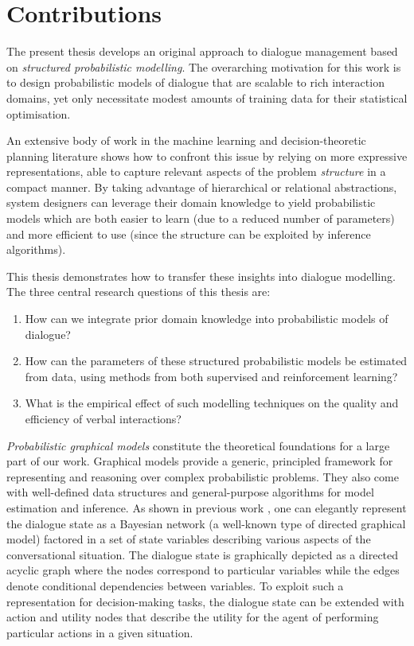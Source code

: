 \section{Contributions}

The present thesis develops an original approach to dialogue management based on \textit{structured probabilistic modelling}.  The overarching motivation for this work is to design probabilistic models of dialogue that are scalable to rich interaction domains, yet only necessitate modest amounts of training data for their statistical optimisation.

An extensive body of work in the machine learning and decision-theoretic planning literature shows how to confront this issue by relying on more expressive representations, able to capture relevant aspects of the problem \textit{structure} in a compact manner. By taking advantage of hierarchical or relational abstractions, system designers can leverage their domain knowledge to yield probabilistic models which are both easier to learn (due to a reduced number of parameters) and more efficient to use (since the structure can be exploited by inference algorithms).  

This thesis demonstrates how to transfer these insights into dialogue modelling.  The three central research questions of this thesis are:
\begin{enumerate}
\item How can we integrate prior domain knowledge into probabilistic models of dialogue?
\item How can the parameters of these structured probabilistic models be estimated from data, using methods from both supervised and reinforcement learning?  
\item What is the empirical effect of such modelling techniques on the quality and efficiency of verbal interactions?
\end{enumerate}

\textit{Probabilistic graphical models} \citep{Koller+Friedman:09} constitute the theoretical foundations for a large part of our work.  Graphical models provide a generic, principled framework for representing and reasoning over complex probabilistic problems. They also come with well-defined data structures and general-purpose algorithms for model estimation and inference.  As shown in previous work \citep[see for instance][]{Thomson:2010:BUD:1772996.1773040}, one can elegantly represent the dialogue state as a Bayesian network (a well-known type of directed graphical model) factored in a set of state variables describing various aspects of the conversational situation.  The dialogue state is graphically depicted as a directed acyclic graph where the nodes correspond to particular variables while the edges denote conditional dependencies between variables. To exploit such a representation for decision-making tasks, the dialogue state can be extended with action and utility nodes that describe the utility for the agent of performing particular actions in a given situation. 


